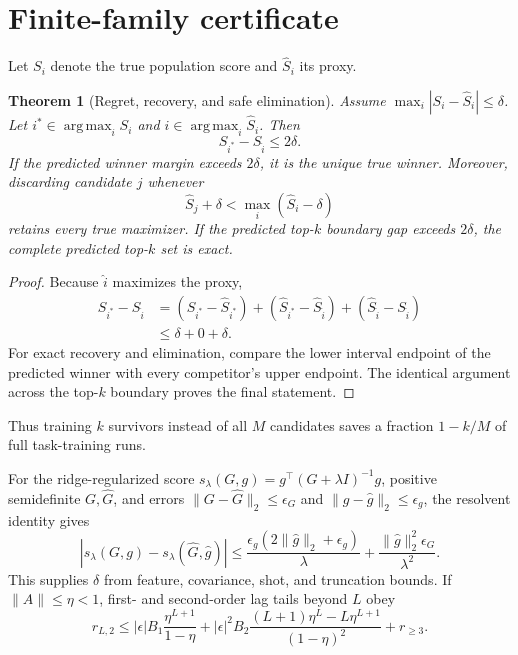 \documentclass[a4paper,twocolumn,11pt,unpublished]{quantumarticle}
\newtheorem{theorem}{Theorem}
\newcommand{\argmax}{\operatorname*{arg\,max}}
\newcommand{\norm}[1]{\lVert#1\rVert}
\begin{document}
\section{Finite-family certificate}
Let $S_i$ denote the true population score and $\widehat S_i$ its proxy.
\begin{theorem}[Regret, recovery, and safe elimination]
Assume $\max_i|S_i-\widehat S_i|\le\delta$. Let
$i^*\in\argmax_iS_i$ and $\widehat i\in\argmax_i\widehat S_i$. Then
\begin{equation}
 S_{i^*}-S_{\widehat i}\le2\delta.
\end{equation}
If the predicted winner margin exceeds $2\delta$, it is the unique true winner.
Moreover, discarding candidate $j$ whenever
\begin{equation}
 \widehat S_j+\delta<\max_i(\widehat S_i-\delta)
\end{equation}
retains every true maximizer. If the predicted top-$k$ boundary gap exceeds
$2\delta$, the complete predicted top-$k$ set is exact.
\end{theorem}
\begin{proof}
Because $\widehat i$ maximizes the proxy,
\begin{align}
 S_{i^*}-S_{\widehat i}
 &=(S_{i^*}-\widehat S_{i^*})
 +(\widehat S_{i^*}-\widehat S_{\widehat i})
 +(\widehat S_{\widehat i}-S_{\widehat i})\\
 &\le\delta+0+\delta.
\end{align}
For exact recovery and elimination, compare the lower interval endpoint of the
predicted winner with every competitor's upper endpoint. The identical
argument across the top-$k$ boundary proves the final statement.
\end{proof}
Thus training $k$ survivors instead of all $M$ candidates saves a fraction
$1-k/M$ of full task-training runs.

For the ridge-regularized score $s_\lambda(G,g)=g^\top(G+\lambda I)^{-1}g$,
positive semidefinite $G,\widehat G$, and errors
$\norm{G-\widehat G}_2\le\epsilon_G$ and
$\norm{g-\widehat g}_2\le\epsilon_g$, the resolvent identity gives
\begin{equation}
 |s_\lambda(G,g)-s_\lambda(\widehat G,\widehat g)|
 \le \frac{\epsilon_g(2\norm{\widehat g}_2+\epsilon_g)}{\lambda}
 +\frac{\norm{\widehat g}_2^2\epsilon_G}{\lambda^2}.
\end{equation}
This supplies $\delta$ from feature, covariance, shot, and truncation bounds.
If $\norm{A}\le\eta<1$, first- and second-order lag tails beyond $L$ obey
\begin{equation}
 r_{L,2}\le |\epsilon|B_1\frac{\eta^{L+1}}{1-\eta}
 +|\epsilon|^2B_2\frac{(L+1)\eta^L-L\eta^{L+1}}{(1-\eta)^2}
 +r_{\ge3}.
\end{equation}
\end{document}

